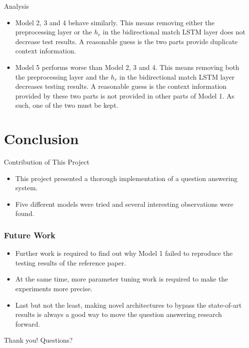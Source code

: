 \documentclass{beamer}
\begin{document}
\begin{frame}{Analysis}
    \begin{itemize}
        \item Model 2, 3 and 4 behave similarly. This means removing either the preprocessing layer or the $h_r$ in the bidirectional match LSTM layer does not decrease test results. A reasonable guess is the two parts provide duplicate context information.

        \item Model 5 performs worse than Model 2, 3 and 4. This means removing both the preprocessing layer and the $h_r$ in the bidirectional match LSTM layer decreases testing results. A reasonable guess is the context information provided by these two parts is not provided in other parts of Model 1. As such, one of the two must be kept.
    \end{itemize}
\end{frame}

\section{Conclusion}

\begin{frame}{Contribution of This Project}
    \begin{itemize}
        \item This project presented a thorough implementation of a question answering system. \item Five different models were tried and several interesting observations were found.
    \end{itemize}

\end{frame}

\begin{frame} \frametitle{Future Work}
    \begin{itemize}
        \item Further work is required to find out why Model 1 failed to reproduce the testing results of the reference paper.
        \item At the same time, more parameter tuning work is required to make the experiments more precise. \item Last but not the least, making novel architectures to bypass the state-of-art results is always a good way to move the question answering research forward.
    \end{itemize}
\end{frame}

\begin{frame}
Thank you! Questions?
\end{frame}
\end{document}
